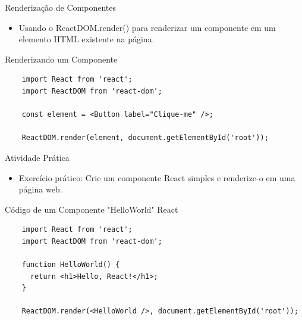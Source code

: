 \documentclass[13pt, xcolor={dvipsnames,svgnames}, portuguese]{beamer}
\begin{document}
\begin{frame}[fragile]{Renderização de Componentes}
  \begin{itemize}
    \item Usando o ReactDOM.render() para renderizar um componente em um elemento HTML existente na página.
  \end{itemize}
  
  \begin{exampleblock}{Renderizando um Componente}
    \begin{verbatim}
    import React from 'react';
    import ReactDOM from 'react-dom';
    
    const element = <Button label="Clique-me" />;
    
    ReactDOM.render(element, document.getElementById('root'));
    \end{verbatim}
  \end{exampleblock}
\end{frame}

\begin{frame}[fragile]{Atividade Prática}
  \begin{itemize}
    \item Exercício prático: Crie um componente React simples e renderize-o em uma página web.
  \end{itemize}
  
\begin{exampleblock}{Código de um Componente "HelloWorld" React}
    \begin{verbatim}
    import React from 'react';
    import ReactDOM from 'react-dom';
    
    function HelloWorld() {
      return <h1>Hello, React!</h1>;
    }
    
    ReactDOM.render(<HelloWorld />, document.getElementById('root'));
    \end{verbatim}
\end{exampleblock}
\end{frame}








\end{document}
